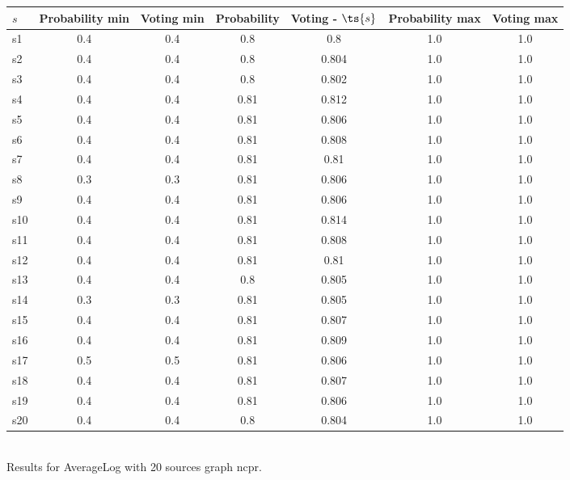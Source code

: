 \documentclass{article}
\begin{document}
\noindent\begin{tabular}{|l|c|c|c|c|c|c|}
\hline
$s$& Probability min & Voting min & Probability & Voting - $\ts{s}$ & Probability max & Voting max\\
\hline
s1 &0.4 & 0.4 & 0.8 & 0.8 & 1.0 & 1.0\\
\hline
s2 &0.4 & 0.4 & 0.8 & 0.804 & 1.0 & 1.0\\
\hline
s3 &0.4 & 0.4 & 0.8 & 0.802 & 1.0 & 1.0\\
\hline
s4 &0.4 & 0.4 & 0.81 & 0.812 & 1.0 & 1.0\\
\hline
s5 &0.4 & 0.4 & 0.81 & 0.806 & 1.0 & 1.0\\
\hline
s6 &0.4 & 0.4 & 0.81 & 0.808 & 1.0 & 1.0\\
\hline
s7 &0.4 & 0.4 & 0.81 & 0.81 & 1.0 & 1.0\\
\hline
s8 &0.3 & 0.3 & 0.81 & 0.806 & 1.0 & 1.0\\
\hline
s9 &0.4 & 0.4 & 0.81 & 0.806 & 1.0 & 1.0\\
\hline
s10 &0.4 & 0.4 & 0.81 & 0.814 & 1.0 & 1.0\\
\hline
s11 &0.4 & 0.4 & 0.81 & 0.808 & 1.0 & 1.0\\
\hline
s12 &0.4 & 0.4 & 0.81 & 0.81 & 1.0 & 1.0\\
\hline
s13 &0.4 & 0.4 & 0.8 & 0.805 & 1.0 & 1.0\\
\hline
s14 &0.3 & 0.3 & 0.81 & 0.805 & 1.0 & 1.0\\
\hline
s15 &0.4 & 0.4 & 0.81 & 0.807 & 1.0 & 1.0\\
\hline
s16 &0.4 & 0.4 & 0.81 & 0.809 & 1.0 & 1.0\\
\hline
s17 &0.5 & 0.5 & 0.81 & 0.806 & 1.0 & 1.0\\
\hline
s18 &0.4 & 0.4 & 0.81 & 0.807 & 1.0 & 1.0\\
\hline
s19 &0.4 & 0.4 & 0.81 & 0.806 & 1.0 & 1.0\\
\hline
s20 &0.4 & 0.4 & 0.8 & 0.804 & 1.0 & 1.0\\
\hline
\end{tabular}\\

\noindent Results for AverageLog with 20 sources graph ncpr.
\end{document}
